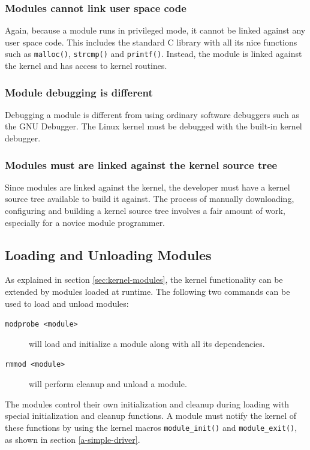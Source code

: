 \subsubsection{Modules cannot link user space code}
Again, because a module runs in privileged mode, it cannot be linked against any user space code. This includes the standard C library with all its nice functions such as \texttt{malloc()}, \texttt{strcmp()} and \texttt{printf()}. Instead, the module is linked against the kernel and has access to kernel routines.

\subsubsection{Module debugging is different}
Debugging a module is different from using ordinary software debuggers such as the GNU Debugger. The Linux kernel must be debugged with the built-in kernel debugger.

\subsubsection{Modules must are linked against the kernel source tree}
Since modules are linked against the kernel, the developer must have a kernel source tree available to build it against. The process of manually downloading, configuring and building a kernel source tree involves a fair amount of work, especially for a novice module programmer.


\subsection{Loading and Unloading Modules}
As explained in section \ref{sec:kernel-modules}, the kernel functionality can be extended by modules loaded at runtime. The following two commands can be used to load and unload modules:
\begin{description}
  \item[\texttt{modprobe <module>}] will load and initialize a module along with all its dependencies.
  \item[\texttt{rmmod <module>}] will perform cleanup and unload a module.
\end{description}
The modules control their own initialization and cleanup during loading with special initialization and cleanup functions. A module must notify the kernel of these functions by using the kernel macros \texttt{module\_init()} and \texttt{module\_exit()}, as shown in section \ref{a-simple-driver}.

